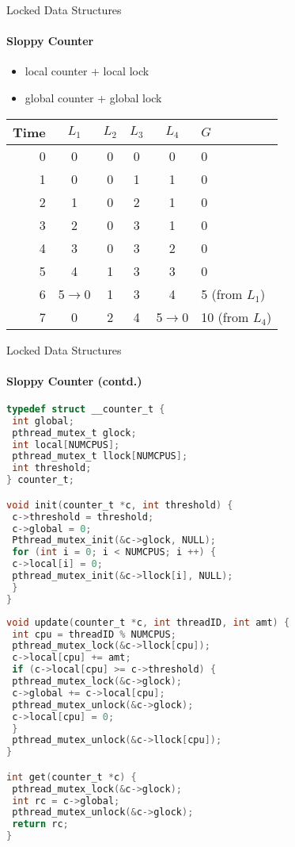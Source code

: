 \documentclass[10pt]{beamer}
\begin{document}
\begin{frame}{Locked Data Structures}
\framesubtitle{Sloppy Counter}
\begin{itemize}
 
\item local counter + local lock
\item global counter + global lock
\end{itemize}
\begin{table}
\scriptsize
\begin{tabular}{r|c c c c|l}
Time&$L_1$&$L_2$&$L_3$&$L_4$&$G$\\
\hline
0&0&0&0&0&0\\
1&0&0&1&1&0\\
2&1&0&2&1&0\\
3&2&0&3&1&0\\
4&3&0&3&2&0\\
5&4&1&3&3&0\\
6&5$\rightarrow$0&1&3&4&5 (from $L_1$)\\
7&0&2&4&5$\rightarrow$0&10 (from $L_4$)\\
\end{tabular}
\end{table}
\end{frame}

\begin{frame}[fragile]{Locked Data Structures}
\framesubtitle{Sloppy Counter (contd.)}
\begin{minipage}{.49\linewidth}
\begin{lstlisting}[language=C]
typedef struct __counter_t {
 int global;
 pthread_mutex_t glock;
 int local[NUMCPUS];
 pthread_mutex_t llock[NUMCPUS];
 int threshold;
} counter_t;

void init(counter_t *c, int threshold) {
 c->threshold = threshold;
 c->global = 0;
 Pthread_mutex_init(&c->glock, NULL);
 for (int i = 0; i < NUMCPUS; i ++) {
 c->local[i] = 0;
 pthread_mutex_init(&c->llock[i], NULL);
 }
}
\end{lstlisting}
\end{minipage}
\hspace{13pt}
\begin{minipage}{.49\linewidth}
\begin{lstlisting}[language=C]
void update(counter_t *c, int threadID, int amt) {
 int cpu = threadID % NUMCPUS;
 pthread_mutex_lock(&c->llock[cpu]);
 c->local[cpu] += amt;
 if (c->local[cpu] >= c->threshold) {
 pthread_mutex_lock(&c->glock);
 c->global += c->local[cpu];
 pthread_mutex_unlock(&c->glock);
 c->local[cpu] = 0;
 }
 pthread_mutex_unlock(&c->llock[cpu]);
}

int get(counter_t *c) {
 pthread_mutex_lock(&c->glock);
 int rc = c->global;
 pthread_mutex_unlock(&c->glock);
 return rc;
}
\end{lstlisting}
\end{minipage}
\end{frame}
\end{document}

